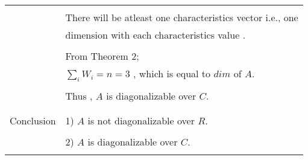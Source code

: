 \documentclass[journal,12pt]{IEEEtran}
\begin{document}
\begin{longtable}{|l|l|}
&\\
&There will be atleast one characteristics vector i.e., one\\ & dimension with each characteristics value .\\
&\\
& From Theorem 2;\\
& $\sum_{i} W_i = n = 3$ , which is equal to $dim$ of $A$.\\
&\\
& Thus , $A$ is diagonalizable over $C$.\\
&\\
\hline
\multirow{3}{*}{Conclusion} & \\
& 1) $A$ is not diagonalizable over $R$. \\
&\\
& 2) $A$ is diagonalizable over $C$.\\
&\\
\hline
\end{longtable}
\end{document}

